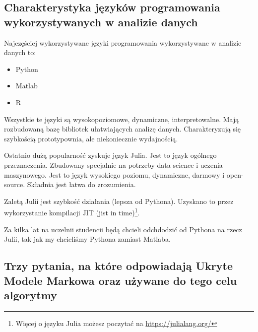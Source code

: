 \documentclass[wi]{zut}
\begin{document}
\subsection{Charakterystyka języków programowania wykorzystywanych w analizie danych}

Najczęściej wykorzystywane języki programowania wykorzystywane w analizie danych to:

\begin{itemize}
    \item Python
    \item Matlab
    \item R
\end{itemize}

Wszystkie te języki są wysokopoziomowe, dynamiczne, interpretowalne. Mają rozbudowaną bazę bibliotek ułatwiających analizę danych. Charakteryzują się szybkością prototypownia, ale niekoniecznie wydajnością.

Ostatnio dużą popularność zyskuje język Julia. Jest to język ogólnego przeznaczenia. Zbudowany specjalnie na potrzeby data science i uczenia maszynowego. Jest to język wysokiego poziomu, dynamiczne, darmowy i open-source. Składnia jest łatwa do zrozumienia. 

Zaletą Julii jest szybkość działania (lepsza od Pythona). Uzyskano to przez wykorzystanie kompilacji JIT (jist in time)\footnote{Więcej o języku Julia możesz poczytać na \url{https://julialang.org/}}. 

Za kilka lat na uczelnii studencii będą chcieli odchdodzić od Pythona na rzecz Julii, tak jak my chcieliśmy Pythona zamiast Matlaba.




\subsection{Trzy pytania, na które odpowiadają Ukryte Modele Markowa oraz używane do tego celu algorytmy}
\end{document}
